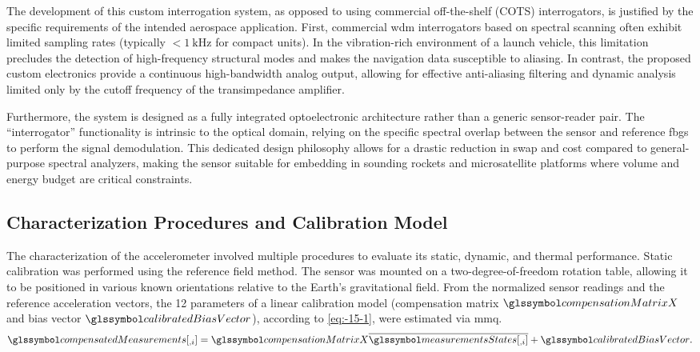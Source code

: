 \documentclass[sensors,article,accept,pdftex,moreauthors]{Definitions/mdpi}
\begin{document}
The development of this custom interrogation system, as opposed to using commercial off-the-shelf (COTS) interrogators, is justified by the specific requirements of the intended aerospace application. First, commercial \gls{wdm} interrogators based on spectral scanning often exhibit limited sampling rates (typically $<\SI{1}{\kilo\hertz}$ for compact units). In the vibration-rich environment of a launch vehicle, this limitation precludes the detection of high-frequency structural modes and makes the navigation data susceptible to aliasing. In contrast, the proposed custom electronics provide a continuous high-bandwidth analog output, allowing for effective anti-aliasing filtering and dynamic analysis limited only by the cutoff frequency of the transimpedance amplifier.

Furthermore, the system is designed as a fully integrated optoelectronic architecture rather than a generic sensor-reader pair. The ``interrogator'' functionality is intrinsic to the optical domain, relying on the specific spectral overlap between the sensor and reference \glspl{fbg} to perform the signal demodulation. This dedicated design philosophy allows for a drastic reduction in \gls{swap} and cost compared to general-purpose spectral analyzers, making the sensor suitable for embedding in sounding rockets and microsatellite platforms where volume and energy budget are critical constraints.

\subsection{Characterization Procedures and Calibration Model}\label{sec:calibration}

The characterization of the accelerometer involved multiple procedures to evaluate its static, dynamic, and thermal performance. Static calibration was performed using the reference field method. The sensor was mounted on a two-degree-of-freedom rotation table, allowing it to be positioned in various known orientations relative to the Earth's gravitational field. From the normalized sensor readings and the reference acceleration vectors, the 12 parameters of a linear calibration model (compensation matrix $\compensationMatrixX$ and bias vector $\calibratedBiasVector$), according to \cref{eq:-15-1}, were estimated via \gls{mmq}.
\begin{equation}
	\compensatedMeasurements[{}_{,i}]=\compensationMatrixX\overline{\measurementsStates[{}_{,i}]}+\calibratedBiasVector.
	\label{eq:-15-1}
\end{equation}
\end{document}
